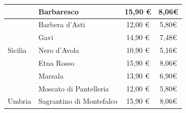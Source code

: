 \documentclass[12pt, a4paper]{article}
\begin{document}
\begin{longtable}{@{}|l|l|c|c|}
                         & Barbaresco                                                                & 15,90 €                                                         & 8,06€                                                                                                         \\ \hline
                         & Barbera d'Asti                                                            & 12,00 €                                                         & 5,80€                                                                                                         \\ \hline
                         & Gavi                                                                      & 14,90 €                                                         & 7,48€                                                                                                         \\ \hline
    Sicilia              & Nero d'Avola                                                              & 10,90 €                                                          & 5,16€                                                                                                         \\ \hline
                         & Etna Rosso                                                                & 15,90 €                                                         & 8,06€                                                                                                         \\ \hline
                         & Marsala                                                                   & 13,90 €                                                         & 6,90€                                                                                                         \\ \hline
                         & Moscato di Pantelleria                                                    & 12,00 €                                                         & 5,80€                                                                                                         \\ \hline
    Umbria               & Sagrantino di Montefalco                                                  & 15,90 €                                                         & 8,06€                                                                                                         \\ \hline

\end{longtable}
\end{document}
